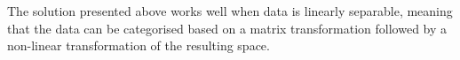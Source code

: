 \documentclass[a4paper, justified]{tufte-handout}
\makeatletter
\def\sigmoidscale{1}
\def\sigmoidtransformation{%
\pgf@xa=\pgf@x%
\pgf@ya=\pgf@y%
\pgfmathsetmacro{\sigmoidx}{\sigmoidscale*1cm/(1+exp(min(-\pgf@xa/1cm, 5)))}%
\pgfmathsetmacro{\sigmoidy}{\sigmoidscale*1cm/(1+exp(min(-\pgf@ya/1cm, 5)))}%
\pgf@x=\sigmoidx pt
\pgf@y=\sigmoidy pt
}
\makeatother
\begin{document}
The solution presented above works well when data is linearly separable, meaning that the data can be categorised based on a matrix transformation followed by a non-linear transformation of the resulting space. %

%
\end{document}
